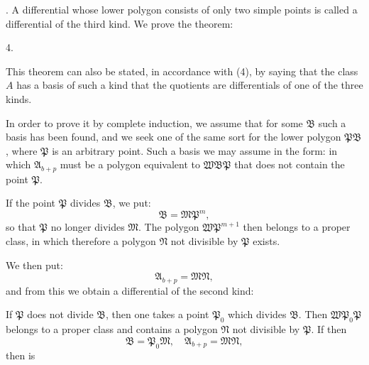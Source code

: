 . A differential whose lower polygon consists of only two simple points is called a differential of the third kind. We prove the theorem:

4. 

This theorem can also be stated, in accordance with (4), by saying that the class $A$ has a basis
of such a kind that the quotients
are differentials of one of the three kinds.

In order to prove it by complete induction, we assume that for some $\mathfrak{B}$ such a basis has been found, and we seek one of the same sort for the lower polygon $\mathfrak{P}\mathfrak{B}$, where $\mathfrak{P}$ is an arbitrary point. Such a basis we may assume in the form:
in which $\mathfrak{A}_{b+p}$ must be a polygon equivalent to $\mathfrak{W}\mathfrak{B}\mathfrak{P}$ that does not contain the point $\mathfrak{P}$.

If the point $\mathfrak{P}$ divides $\mathfrak{B}$, we put:
\[
\mathfrak{B} = \mathfrak{M}\mathfrak{P}^m,
\]
so that $\mathfrak{P}$ no longer divides $\mathfrak{M}$. The polygon $\mathfrak{W}\mathfrak{P}^{m+1}$ then belongs to a proper class, in which therefore a polygon $\mathfrak{N}$ not divisible by $\mathfrak{P}$ exists.

We then put:
\[
\mathfrak{A}_{b+p} = \mathfrak{M}\mathfrak{N},
\]
and from this we obtain a differential of the second kind:

If $\mathfrak{P}$ does not divide $\mathfrak{B}$, then one takes a point $\mathfrak{P}_0$ which divides $\mathfrak{B}$. Then $\mathfrak{W}\mathfrak{P}_0\mathfrak{P}$ belongs to a proper class and contains a polygon $\mathfrak{N}$ not divisible by $\mathfrak{P}$. If then
\[
\mathfrak{B} = \mathfrak{P}_0\mathfrak{M}, \quad \mathfrak{A}_{b+p} = \mathfrak{M}\mathfrak{N},
\]
then
is
